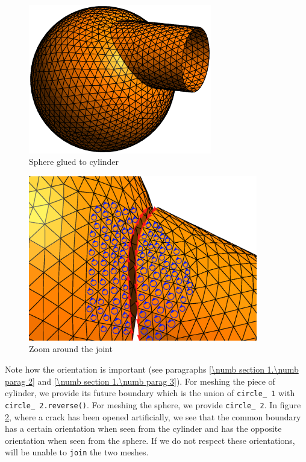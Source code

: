\begin{figure} \centering
 \includegraphics[width=80mm]{sphere-cyl}
  \caption{Sphere glued to cylinder}
  \label{\numb section 3.\numb fig 5}
\end{figure}

\begin{figure}[ht] \centering
 \includegraphics[width=100mm]{crack}
  \caption{Zoom around the joint}
  \label{\numb section 3.\numb fig 6}
\end{figure}

Note how the orientation is important (see paragraphs \ref{\numb section 1.\numb parag 2}
and \ref{\numb section 1.\numb parag 3}).
For meshing the piece of cylinder, we provide its future boundary which is the union of
{\small\tt circle\_\,1} with {\small\tt circle\_\,2.reverse()}.
For meshing the sphere, we provide {\small\tt circle\_\,2}.
In figure \ref{\numb section 3.\numb fig 6}, where a crack has been opened artificially,
we see that the common boundary has a certain orientation when seen from the cylinder and
has the opposite orientation when seen from the sphere.
If we do not respect these orientations, {\maniFEM} will be unable to {\small\tt join} the two
meshes.

